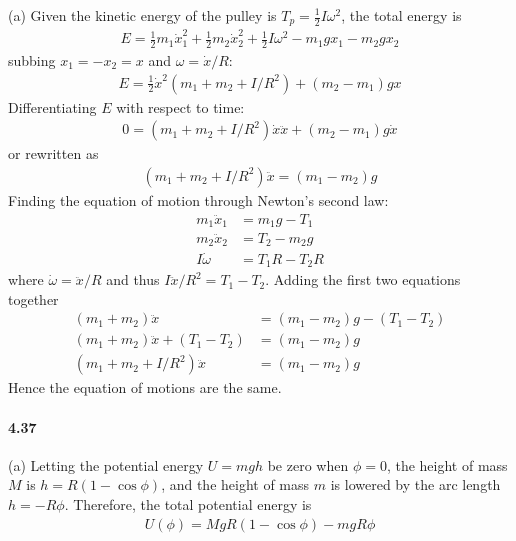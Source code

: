 \documentclass[../problems.tex]{subfiles}
\begin{document}
(a) Given the kinetic energy of the pulley is $T_p = \frac{1}{2} I \omega^2$, the total energy is
\begin{align*}
    E = \frac{1}{2} m_1 \dot{x}_1^2 + \frac{1}{2} m_2 \dot{x}_2^2 + \frac{1}{2} I \omega^2 -
    m_1 g x_1 - m_2 g x_2
\end{align*}
subbing $x_1 = -x_2 = x$ and $\omega = \dot{x}/R$:
\begin{align*}
    E = \frac{1}{2} \dot{x}^2 (m_1 + m_2 + I/R^2) + (m_2 - m_1) g x
\end{align*}
Differentiating $E$ with respect to time:
\begin{align*}
    0 = (m_1 + m_2 + I/R^2) \dot{x} \ddot{x} + (m_2 - m_1) g \dot{x}
\end{align*}
or rewritten as
\begin{align*}
    (m_1 + m_2 + I/R^2) \ddot{x} = (m_1 - m_2) g
\end{align*}
Finding the equation of motion through Newton's second law:
\begin{align*}
    m_1 \ddot{x}_1 &= m_1 g - T_1 \\
    m_2 \ddot{x}_2 &= T_2 - m_2 g \\
    I \dot\omega &= T_1 R - T_2 R
\end{align*}
where $\dot{\omega} = \ddot{x} / R$ and thus $I\ddot{x}/R^2 = T_1 - T_2$. Adding the first two
equations together
\begin{align*}
    (m_1 + m_2) \ddot{x} &= (m_1 - m_2) g - (T_1 - T_2) \\
    (m_1 + m_2) \ddot{x} + (T_1 - T_2) &= (m_1 - m_2) g \\
    (m_1 + m_2 + I/R^2) \ddot{x} &= (m_1 - m_2) g
\end{align*}
Hence the equation of motions are the same.

\paragraph{4.37}
(a) Letting the potential energy $U=mgh$ be zero when $\phi=0$, the height of mass $M$ is $h =
R(1 - \cos\phi)$, and the height of mass $m$ is lowered by the arc length $h = -R\phi$. Therefore,
the total potential energy is
\begin{align*}
    U(\phi) = MgR(1 - \cos\phi) - mgR\phi
\end{align*}
\end{document}

